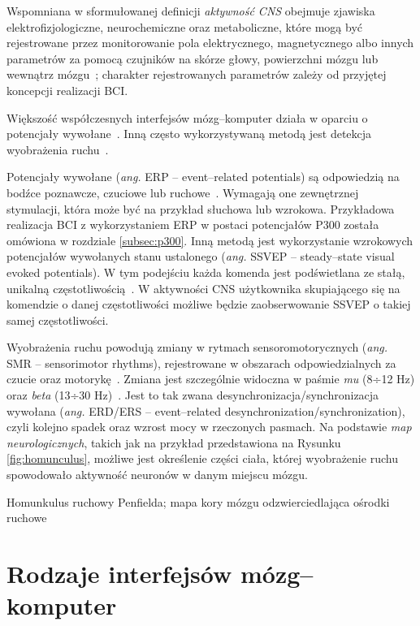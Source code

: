 \documentclass[skorowidz,skroty]{dyplomWEZUT}
\begin{document}
Wspomniana w sformułowanej definicji \textit{aktywność CNS} obejmuje zjawiska elektrofizjologiczne, neurochemiczne oraz metaboliczne, które mogą być rejestrowane przez monitorowanie pola elektrycznego, magnetycznego albo innych parametrów za pomocą czujników na skórze głowy, powierzchni mózgu lub wewnątrz mózgu~\cite{bci_principles}; charakter rejestrowanych parametrów zależy od przyjętej koncepcji realizacji BCI. 

Większość współczesnych interfejsów mózg--komputer działa w oparciu o potencjały wywołane~\cite{bci_revolutionizing,eeg_features}. Inną często wykorzystywaną metodą jest detekcja wyobrażenia ruchu~\cite{bci_revolutionizing}.

Potencjały wywołane (\textit{ang.} ERP -- event--related potentials) są odpowiedzią na bodźce poznawcze, czuciowe lub ruchowe~\cite{eeg_features}. Wymagają one zewnętrznej stymulacji, która może być na przykład słuchowa lub wzrokowa. Przykładowa realizacja BCI z wykorzystaniem ERP w postaci potencjałów P300 została omówiona w rozdziale \vref{subsec:p300}. Inną metodą jest wykorzystanie wzrokowych potencjałów wywołanych stanu ustalonego (\textit{ang.} SSVEP -- steady--state visual evoked potentials). W tym podejściu każda komenda jest podświetlana ze stałą, unikalną częstotliwością~\cite{bci_revolutionizing}. W aktywności CNS użytkownika skupiającego się na komendzie o danej częstotliwości możliwe będzie zaobserwowanie SSVEP o takiej samej częstotliwości.

Wyobrażenia ruchu powodują zmiany w rytmach sensoromotorycznych (\textit{ang.} SMR -- sensorimotor rhythms), rejestrowane w obszarach odpowiedzialnych za czucie oraz motorykę~\cite{bci_revolutionizing}. Zmiana jest szczególnie widoczna w paśmie \textit{mu} (8÷12 Hz) oraz \textit{beta} (13÷30 Hz)~\cite{bci_introduction}. Jest to tak zwana desynchronizacja/synchronizacja wywołana (\textit{ang.} ERD/ERS -- event--related desynchronization/synchronization), czyli kolejno spadek oraz wzrost mocy w rzeczonych pasmach. Na podstawie \textit{map neurologicznych}, takich jak na przykład przedstawiona na Rysunku \vref{fig:homunculus}, możliwe jest określenie części ciała, której wyobrażenie ruchu spowodowało aktywność neuronów w danym miejscu mózgu.


{Homunkulus ruchowy Penfielda; mapa kory mózgu odzwierciedlająca ośrodki ruchowe\label{fig:homunculus}}
{\cite{bci_principles}}

\section{Rodzaje interfejsów mózg--komputer}
\end{document}
